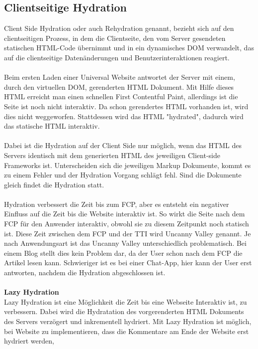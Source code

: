 \documentclass[runningheads]{llncs}
\begin{document}
\subsection{Clientseitige Hydration}
\label{subsec:Clientseitige Hydration}
Client Side Hydration oder auch Rehydration genannt, 
bezieht sich auf den clientseitigen Prozess, 
in dem die Clientseite, 
den vom Server gesendeten statischen HTML-Code übernimmt und 
in ein dynamisches DOM verwandelt, 
das auf die clientseitige Datenänderungen und Benutzerinteraktionen reagiert. 
\\
\\
Beim ersten Laden einer Universal Website antwortet der Server mit einem, 
durch den virtuellen DOM, gerenderten HTML Dokument. 
Mit Hilfe dieses HTML erreicht man einen schnellen First Contentful Paint, 
allerdings ist die Seite ist noch nicht interaktiv. 
Da schon gerendertes HTML vorhanden ist, 
wird dies nicht weggeworfen. Stattdessen wird das HTML "hydrated", 
dadurch wird das statische HTML interaktiv. 
\\
\\
Dabei ist die Hydration auf der Client Side nur möglich, 
wenn das HTML des Servers identisch mit dem generierten HTML des jeweiligen 
Client-side Frameworks ist. 
Unterscheiden sich die jeweiligen Markup Dokumente, 
kommt es zu einem Fehler und der Hydration Vorgang schlägt fehl. 
Sind die Dokumente gleich findet die Hydration statt.
\\
\\
Hydration verbessert die Zeit bis zum FCP, 
aber es entsteht ein negativer Einfluss auf die Zeit bis die Website interaktiv ist. 
So wirkt die Seite nach dem FCP für den Anwender interaktiv, 
obwohl sie zu diesem Zeitpunkt noch statisch ist. 
Diese Zeit zwischen dem FCP und der TTI wird Uncanny Valley genannt. 
Je nach Anwendungsart ist das Uncanny Valley unterschiedlich problematisch. 
Bei einem Blog stellt dies kein Problem dar, 
da der User schon nach dem FCP die Artikel lesen kann. 
Schwieriger ist es bei einer Chat-App, 
hier kann der User erst antworten, 
nachdem die Hydration abgeschlossen ist.
\\
\\
\textbf{Lazy Hydration}
\\
Lazy Hydration ist eine Möglichkeit die Zeit bis eine Webseite Interaktiv ist, 
zu verbessern. Dabei wird die Hydratation des vorgerenderten HTML Dokuments des Servers verzögert und 
inkrementell hydriert. Mit Lazy Hydration ist möglich, 
bei Website zu implementieren, 
dass die Kommentare am Ende der Website erst hydriert werden, 
\end{document}
